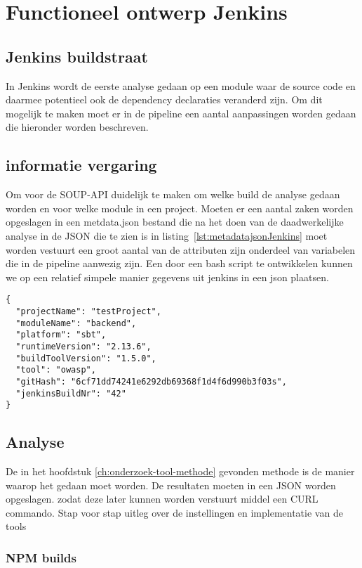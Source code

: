 \chapter{Functioneel ontwerp Jenkins}\label{ch:impl-Jenkins}


\section{Jenkins buildstraat}\label{sec:jenkins-buildtstraat}
In Jenkins wordt de eerste analyse gedaan op een module waar de source code en daarmee potentieel ook de dependency declaraties veranderd zijn.
Om dit mogelijk te maken moet er in de pipeline een aantal aanpassingen worden gedaan die hieronder worden beschreven.


\section{informatie vergaring}\label{sec:informatie-vergaring}
Om voor de SOUP-API duidelijk te maken om welke build de analyse gedaan worden en voor welke module in een project. Moeten er een aantal zaken worden opgeslagen in een metdata.json bestand die na het doen van de daadwerkelijke analyse in de JSON die te zien is in listing~\ref{lst:metadatajsonJenkins} moet worden vestuurt een groot aantal van de attributen zijn onderdeel van variabelen die in de pipeline aanwezig zijn.
Een door een bash script te ontwikkelen kunnen we op een relatief simpele manier gegevens uit jenkins in een json plaatsen.

\begin{lstlisting}[caption={metadata JSon object behorende bij de case class}, label={lst:metadatajsonJenkins}]
{
  "projectName": "testProject",
  "moduleName": "backend",
  "platform": "sbt",
  "runtimeVersion": "2.13.6",
  "buildToolVersion": "1.5.0",
  "tool": "owasp",
  "gitHash": "6cf71dd74241e6292db69368f1d4f6d990b3f03s",
  "jenkinsBuildNr": "42"
}
\end{lstlisting}

\section{Analyse}
De in het hoofdstuk \ref{ch:onderzoek-tool-methode} gevonden methode is de manier waarop het gedaan moet worden. De resultaten moeten in een JSON worden opgeslagen. zodat deze later kunnen worden verstuurt middel een CURL commando.
Stap voor stap uitleg over de instellingen en implementatie van de tools
\subsection{NPM builds}


